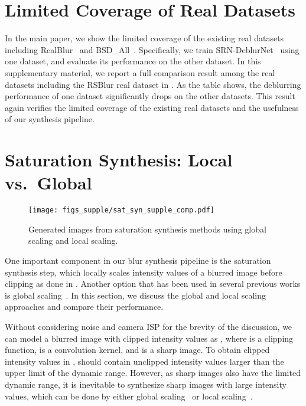 \section{Limited Coverage of Real Datasets}


In the main paper, we show the limited coverage of the existing real datasets including RealBlur~\cite{jsrim-ECCV2020} and BSD\_All~\cite{Zhong_2020_ECCV,Zhong_2021_arxiv}.
Specifically, we train SRN-DeblurNet~\cite{Tao-CVPR18} using one dataset, and evaluate its performance on the other dataset.
In this supplementary material, we report a full comparison result among the real datasets including the RSBlur real dataset in .
As the table shows, the deblurring performance of one dataset significantly drops on the other datasets.
This result again verifies the limited coverage of the existing real datasets and the usefulness of our synthesis pipeline.

\section{Saturation Synthesis: Local vs.~Global}

\begin{figure}[t]
\centering
\texttt{[image: figs\_supple/sat\_syn\_supple\_comp.pdf]}
\caption{Generated images from saturation synthesis methods using global scaling and local scaling.}
\label{fig:generating_saturation_synthesis}
\end{figure}

One important component in our blur synthesis pipeline is the saturation synthesis step, which locally scales intensity values of a blurred image before clipping as done in \cite{Hu-CVPR14}.
Another option that has been used in several previous works is global scaling~\cite{PAN_2017_TPAMI, Chen_2021_CVPR, NEURIPS2018_0aa1883c}.
In this section, we discuss the global and local scaling approaches and compare their performance.

Without considering noise and camera ISP for the brevity of the discussion, we can model a blurred image  with clipped intensity values as , where  is a clipping function,  is a convolution kernel, and  is a sharp image.
To obtain clipped intensity values in ,  should contain unclipped intensity values larger than the upper limit of the dynamic range.
However, as sharp images also have the limited dynamic range, it is inevitable to synthesize sharp images with large intensity values, which can be done by either global scaling~\cite{PAN_2017_TPAMI, Chen_2021_CVPR, NEURIPS2018_0aa1883c} or local scaling~\cite{Hu-CVPR14}.

